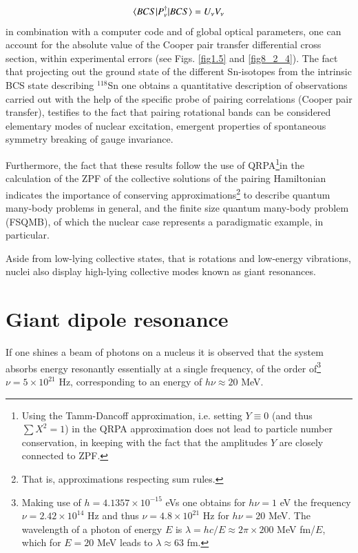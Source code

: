 \begin{align}\label{eq0.1.104}
\langle {BCS|P^\dagger_\nu|BCS} \rangle=U_\nu V_\nu
\end{align}
in combination with a computer code and of global optical parameters, one can account for the  absolute value of the Cooper pair transfer differential cross section, within experimental errors (see Figs. \ref{fig1.5} and   \ref{fig8_2_4}). The fact that projecting out the ground state of the   different Sn-isotopes from the intrinsic BCS state describing $^{118}$Sn one obtains a quantitative description of observations carried out with the help of the specific probe of pairing correlations (Cooper pair transfer), testifies to the fact that pairing rotational bands can be considered elementary modes of nuclear excitation, emergent properties of spontaneous symmetry breaking of  gauge invariance. 

Furthermore, the fact that these results follow the use of QRPA\footnote{Using the Tamm-Dancoff approximation, i.e. setting $Y\equiv0$ (and thus $\sum X^2=1$) in the QRPA approximation does not lead to particle number conservation, in keeping with the fact that the amplitudes $Y$ are closely connected to ZPF.}in the calculation of the ZPF of the collective solutions of the pairing Hamiltonian indicates the importance of conserving approximations\footnote{That is, approximations respecting sum rules.} to describe quantum many-body problems in general, and the finite size quantum many-body problem (FSQMB), of which the nuclear case represents a paradigmatic example, in particular. 

Aside from low-lying collective states, that is rotations and low-energy vibrations, nuclei also display high-lying collective modes known as giant resonances.
\section{Giant dipole resonance}\label{S1.5}
If one shines a beam of photons on a nucleus it is observed that the system 
absorbs energy resonantly essentially at a single frequency, of the order of\footnote{Making use of $h=4.1357\times10^{-15}$ eVs one obtains for $h\nu=1$ eV the frequency $\nu=2.42\times10^{14}$ Hz and thus $\nu=4.8\times10^{21}$ Hz for $h\nu=20$ MeV. The wavelength of a photon of energy $E$ is $\lambda=hc/E\approx2\pi\times200$ MeV fm/$E$, which for $E=20$ MeV leads to $\lambda\approx63$ fm.} $\nu=5\times10^{21}$ Hz, corresponding to an energy of $h\nu\approx20$ MeV.

